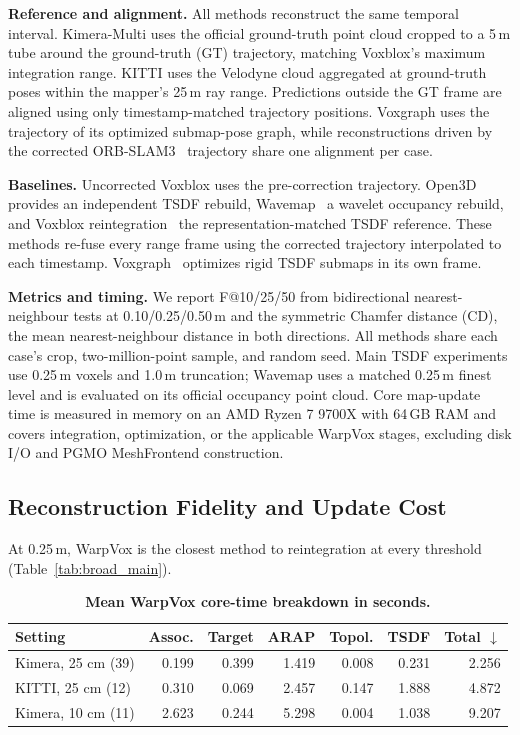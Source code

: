 \noindent\textbf{Reference and alignment.}
All methods reconstruct the same temporal interval. Kimera-Multi uses the
official ground-truth point cloud cropped to a 5\,m tube around the ground-truth (GT)
trajectory, matching Voxblox's maximum integration range. KITTI uses the
Velodyne cloud aggregated at ground-truth poses within the mapper's 25\,m
ray range. Predictions outside the GT frame are aligned using only
timestamp-matched trajectory positions.
Voxgraph uses the trajectory of its optimized submap-pose graph,
while reconstructions driven by the corrected ORB-SLAM3~\cite{ORBSLAM3_TRO} trajectory share one
alignment per case.

\noindent\textbf{Baselines.}
Uncorrected Voxblox uses the pre-correction trajectory.
Open3D~\cite{zhou2018open3dmodernlibrary3d} provides an independent TSDF
rebuild, Wavemap~\cite{reijgwart2023wavemap} a wavelet occupancy rebuild,
and Voxblox reintegration~\cite{Oleynikova_2017} the representation-matched
TSDF reference. These methods re-fuse every range frame using the corrected
trajectory interpolated to each timestamp. Voxgraph~\cite{reijgwart2020voxgraph}
optimizes rigid TSDF submaps in its own frame.

\noindent\textbf{Metrics and timing.}
We report F@10/25/50 from bidirectional nearest-neighbour tests at
0.10/0.25/0.50\,m and the symmetric Chamfer distance (CD), the mean
nearest-neighbour distance in both directions. All methods share each case's
crop, two-million-point sample, and random seed. Main TSDF experiments use
0.25\,m voxels and 1.0\,m truncation; Wavemap uses a matched 0.25\,m finest
level and is evaluated on its official occupancy point cloud. Core map-update time is measured in
memory on an AMD Ryzen 7 9700X with 64\,GB RAM and covers integration,
optimization, or the applicable WarpVox stages, excluding disk I/O and PGMO
MeshFrontend construction.

\subsection{Reconstruction Fidelity and Update Cost}

At 0.25\,m, WarpVox is the closest method to reintegration at every
threshold (Table~\ref{tab:broad_main}).

\begin{table}[!t]
\centering
\caption{\textbf{Mean WarpVox core-time breakdown in seconds.}}
\label{tab:runtime_breakdown}
\scriptsize
\setlength{\tabcolsep}{1.25pt}
\begin{tabular}{lrrrrrr}
\toprule
Setting & Assoc. & Target & ARAP & Topol. & TSDF & Total $\downarrow$ \\
\midrule
Kimera, 25 cm (39) & 0.199 & 0.399 & 1.419 & 0.008 & 0.231 & 2.256 \\
KITTI, 25 cm (12)   & 0.310 & 0.069 & 2.457 & 0.147 & 1.888 & 4.872 \\
Kimera, 10 cm (11) & 2.623 & 0.244 & 5.298 & 0.004 & 1.038 & 9.207 \\
\bottomrule
\end{tabular}
\vspace{1pt}
\end{table}

